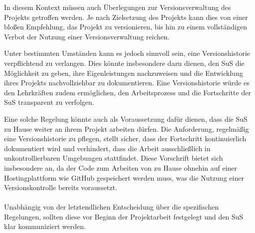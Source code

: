 \documentclass[a4paper,12pt]{article}
\begin{document}
In diesem Kontext müssen auch Überlegungen zur Versionsverwaltung des Projekts getroffen werden. Je nach Zielsetzung des Projekts kann dies von einer bloßen Empfehlung, das Projekt zu versionieren, bis hin zu einem vollständigen Verbot der Nutzung einer Versionsverwaltung reichen.

Unter bestimmten Umständen kann es jedoch sinnvoll sein, eine Versionshistorie verpflichtend zu verlangen. Dies könnte insbesondere dazu dienen, den SuS die Möglichkeit zu geben, ihre Eigenleistungen nachzuweisen und die Entwicklung ihres Projekts nachvollziehbar zu dokumentieren. Eine Versionshistorie würde es den Lehrkräften zudem ermöglichen, den Arbeitsprozess und die Fortschritte der SuS transparent zu verfolgen.

Eine solche Regelung könnte auch als Voraussetzung dafür dienen, dass die SuS zu Hause weiter an ihrem Projekt arbeiten dürfen. Die Anforderung, regelmäßig eine Versionshistorie zu pflegen, stellt sicher, dass der Fortschritt kontinuierlich dokumentiert wird und verhindert, dass die Arbeit ausschließlich in unkontrollierbaren Umgebungen stattfindet. Diese Vorschrift bietet sich insbesondere an, da der Code zum Arbeiten von zu Hause ohnehin auf einer Hostingplattform wie GitHub gespeichert werden muss, was die Nutzung einer Versionskontrolle bereits voraussetzt.\\
\\

Unabhängig von der letztendlichen Entscheidung über die spezifischen Regelungen, sollten diese vor Beginn der Projektarbeit festgelegt und den SuS klar kommuniziert werden.
\end{document}
